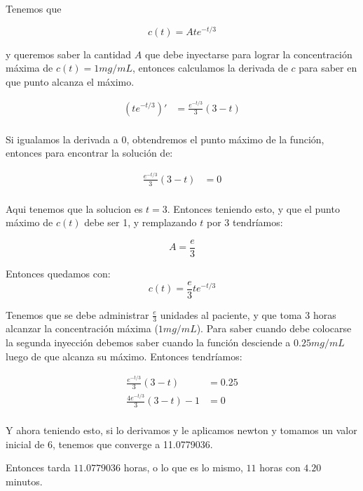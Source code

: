 
Tenemos que

\begin{equation*}
	c(t) = A t e^{-t / 3}
\end{equation*}

y queremos saber la cantidad $A$ que debe inyectarse para lograr
la concentración máxima de $c(t) = 1 mg/mL$, entonces calculamos
la derivada de $c$ para saber en que punto alcanza el máximo.

\begin{align*}
\left(t e^{-t / 3} \right)' & = \frac{e^{-t/3}}{3} (3 - t)  \\
\end{align*}

Si igualamos la derivada a 0, obtendremos el punto máximo de la función, entonces para encontrar la solución de:

\begin{align*}
\frac{e^{-t/3}}{3} (3 - t) & = 0 \\
\end{align*}

Aqui tenemos que la solucion es $t = 3$. 
Entonces teniendo esto, y que el punto máximo de $c(t)$ debe ser 1, y remplazando $t$ por 3 tendríamos:

\begin{equation*}
	A = \frac{e}{3}
\end{equation*}

Entonces quedamos con:
\begin{equation*}
	c(t) = \frac{e}{3} t e^{-t/3}
\end{equation*}

Tenemos que se debe administrar $\frac{e}{3}$ unidades al paciente, y que toma 3 horas alcanzar la concentración máxima ($1mg/mL$).
Para saber cuando debe colocarse la segunda inyección debemos saber cuando la función desciende a $0.25mg/mL$ luego de que alcanza su máximo. Entonces tendríamos:

\begin{align*}
\frac{e^{-t/3}}{3} (3 - t) & = 0.25 \\
\frac{4e^{-t/3}}{3} (3 - t) - 1 & = 0 \\
\end{align*}

Y ahora teniendo esto, si lo derivamos y le aplicamos newton y tomamos un valor inicial de 6, tenemos que converge a  11.0779036.

Entonces tarda  $11.0779036$ horas, o lo que es lo mismo, $11$ horas con $4.20$ minutos.

